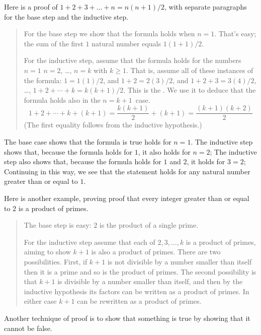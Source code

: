 Here is a proof of \( 1+2+3+\dots+n=n(n+1)/2 \), 
with separate paragraphs for the base step 
and the inductive step.
\begin{quote}\small
For the base step we show that the formula holds when \( n=1 \).
That's easy; the sum of the first \( 1 \) natural number equals 
\( 1(1+1)/2 \).

For the inductive step, assume that the formula holds
for the numbers \( n=1 \) \( n=2 \), \ldots, \( n=k \) with $k\geq 1$.
That is, assume all of these instances of the formula: 
$1=1(1)/2$, and $1+2=2(3)/2$, and $1+2+3=3(4)/2$, \ldots, 
$1+2+\cdots+k=k(k+1)/2$.
This is the 
.
We use it to deduce that 
the formula holds also in the \( n=k+1 \)~case.
\begin{equation*}
  1+2+\cdots+k+(k+1)
  =
  \frac{k(k+1)}{2}+(k+1)
  =
  \frac{(k+1)(k+2)}{2}
\end{equation*}
(The first equality follows from the inductive hypothesis.)
\end{quote}
The base case shows that the formula is true holds for \( n=1 \).
The inductive step shows that,  
because the formula holds for \( 1 \), it also holds for \( n=2 \);
The inductive step also shows that,  
because the formula holds for \( 1 \) and \( 2\), it holds for \( 3=2 \);
Continuing in this way, we see that the statement holds
for any natural number greater than or equal to \( 1 \).

Here is another example, proving
proof that every integer greater than or equal to \( 2 \) is a product
of primes.
\begin{quote}\small
The base step is easy: \( 2 \) is the product of a single prime.

For the inductive step assume that each of \( 2, 3,\ldots ,k \) is a
product of primes, aiming to show \( k+1 \) is also a product of
primes.
There are two possibilities.
First, if \( k+1 \) is not divisible by a number smaller than itself then it
is a prime and so is the product of primes.
The second possibility is that \( k+1 \) is divisible by a number
smaller than itself, and then  by the inductive hypothesis its
factors can be written as a product of primes.
In either case
\( k+1 \) can be rewritten as a product of primes.
\end{quote}





Another technique of proof is
to show that something is true by showing that it cannot be false.

